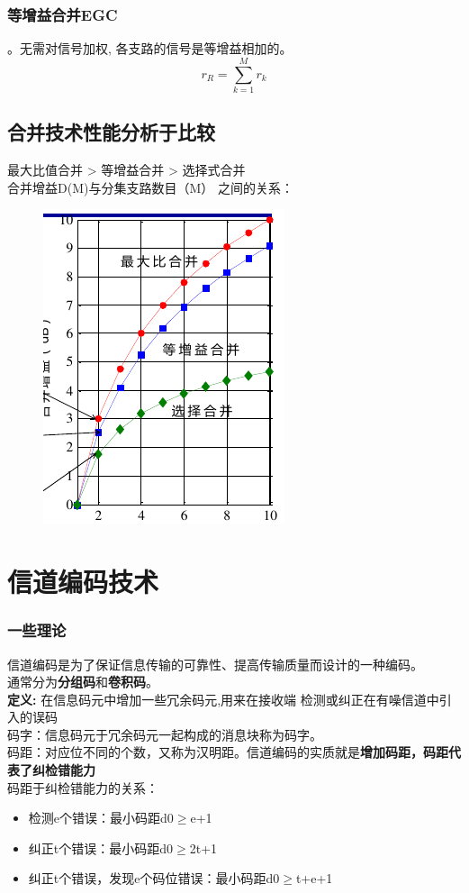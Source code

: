 \subsubsection{等增益合并EGC}
。无需对信号加权,
各支路的信号是等增益相加的。
\begin{equation}\label{key}
r_R = \sum_{k=1}^{M}r_k
\end{equation}
\subsection{合并技术性能分析于比较}
最大比值合并 > 等增益合并 > 选择式合并\\
合并增益D(M)与分集支路数目（M）
之间的关系：
\begin{figure}[H]
	\centering
	\includegraphics[width=0.7\linewidth]{figures/各合并方式性能比较}
	\caption{}
	\label{fig:}
\end{figure}
\section{信道编码技术}
\subsubsection{一些理论}
信道编码是为了保证信息传输的可靠性、提高传输质量而设计的一种编码。\\
通常分为\textbf{分组码}和\textbf{卷积码}。\\
\textbf{定义:} 在信息码元中增加一些冗余码元,用来在接收端
检测或纠正在有噪信道中引入的误码\\
码字：信息码元于冗余码元一起构成的消息块称为码字。\\
码距：对应位不同的个数，又称为汉明距。信道编码的实质就是\textbf{增加码距，码距代表了纠检错能力}\\
码距于纠检错能力的关系：
\begin{itemize}
	\item 检测e个错误：最小码距d0$\ge$e+1
	\item 纠正t个错误：最小码距d0$\ge$2t+1
	\item 纠正t个错误，发现e个码位错误：最小码距d0$\ge$t+e+1
\end{itemize}
